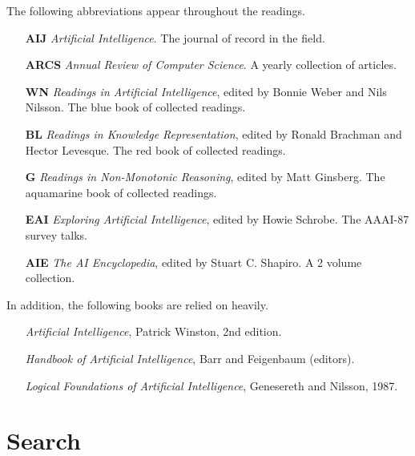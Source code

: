The following abbreviations appear throughout the readings.
\begin{itemize}

\item[{\bf AIJ}] {\em Artificial Intelligence}.  The journal of record
in the field.

\item[{\bf ARCS}] {\em Annual Review of Computer Science}.  A yearly
collection of articles.

\item[{\bf WN}]  {\em Readings in Artificial Intelligence}, edited by
Bonnie Weber and Nils Nilsson.  The blue book of collected readings.

\item[{\bf BL}] {\em Readings in Knowledge Representation}, edited by
Ronald Brachman and Hector Levesque.  The red book of collected
readings.

\item[{\bf G}] {\em Readings in Non-Monotonic Reasoning}, edited
by Matt Ginsberg. The aquamarine book of collected readings.

\item[{\bf EAI}] {\em Exploring Artificial Intelligence}, edited
by Howie Schrobe. The AAAI-87 survey talks.

\item[{\bf AIE}] {\em The AI Encyclopedia}, edited by Stuart C.
Shapiro. A 2 volume collection.

\end{itemize}
In addition, the following books are relied on heavily.
\begin{itemize}

\item[] {\em Artificial Intelligence}, Patrick Winston, 2nd edition.

\item[] {\em Handbook of Artificial Intelligence}, Barr and Feigenbaum
(editors). 


\item[] {\em Logical Foundations of Artificial Intelligence},
Genesereth and Nilsson, 1987.

\end{itemize}


\section{Search}
\label{sec:search}

